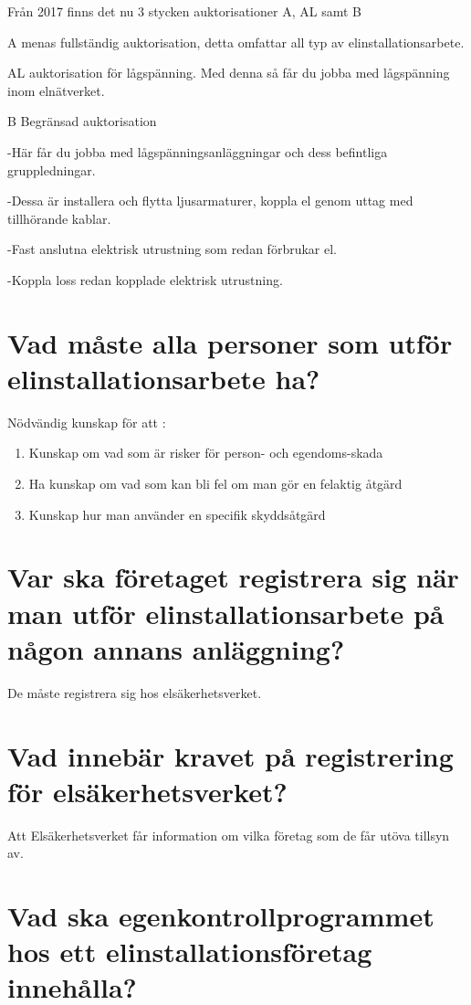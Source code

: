 \documentclass[a4paper,swedish]{article}
\begin{document}
Från 2017 finns det nu 3 stycken auktorisationer A, AL samt B

A menas fullständig auktorisation, detta omfattar all typ av elinstallationsarbete.

AL auktorisation för lågspänning. Med denna så får du jobba med lågspänning inom elnätverket.

B Begränsad auktorisation

-Här får du jobba med lågspänningsanläggningar och dess befintliga  gruppledningar.

-Dessa är installera och flytta ljusarmaturer, koppla el genom uttag med tillhörande kablar.

-Fast anslutna elektrisk utrustning som redan förbrukar el.

-Koppla loss redan kopplade elektrisk utrustning.

\section{Vad måste alla personer som utför elinstallationsarbete ha?}

Nödvändig kunskap för att :

\begin{enumerate}
\item Kunskap om vad som är risker för person- och egendoms-skada
\item Ha kunskap om vad som kan bli fel om man gör en felaktig åtgärd
\item Kunskap hur man använder en specifik skyddsåtgärd
\end{enumerate}

\section{Var ska företaget registrera sig när man utför elinstallationsarbete på någon annans anläggning?}
\label{sec:q_51}

De måste registrera sig hos elsäkerhetsverket.

\section{Vad innebär kravet på registrering för elsäkerhetsverket?}

Att Elsäkerhetsverket får information om vilka företag som de får utöva tillsyn av.

\section{Vad ska egenkontrollprogrammet hos ett elinstallationsföretag innehålla?}
\label{sec:q_53}
\end{document}

